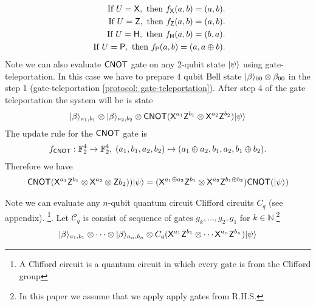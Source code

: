 \begin{equation*}
\begin{aligned}
\mbox{ If } U={\sf X},  \mbox{ then } f_{\sf X}(a,b)=(a,b).\\
\mbox{ If } U={\sf Z},  \mbox{ then } f_{\sf Z}(a,b)=(a,b).\\
\mbox{ If } U={\sf H},  \mbox{ then } f_{\sf H}(a,b)=(b,a).\\
\mbox{ If } U={\sf P},  \mbox{ then } f_ {\sf P}(a,b)=(a,a\oplus b).\\
\end{aligned}
\end{equation*}
Note we can also evaluate ${\sf CNOT}$ gate on any 2-qubit state ${\lvert}\psi\rangle$ using gate-teleportation. In this case we have to prepare $4$ qubit Bell state ${\lvert}\beta\rangle_{00}\otimes \beta_{00}$ in the step 1 (gate-teleportation \ref{protocol: gate-teleportation}). After step 4 of the gate teleportation the system will be is state
\begin{equation*}
\begin{aligned}
 {\lvert}\beta\rangle_{a_1,b_1}\otimes {\lvert}\beta\rangle_{a_2,b_2} \otimes {\sf CNOT}({\sf X}^{a_1}{\sf Z}^{b_1}\otimes {\sf X}^{a_2}{\sf Z}^{b_2}){\lvert}\psi\rangle
\end{aligned}
\end{equation*}
The update rule for the ${\sf CNOT}$ gate is
\begin{equation*}
\begin{aligned}
f_{{\sf CNOT}}:\mathbb{F}_2^4\rightarrow \mathbb{F}_2^4, \; (a_1,b_1,a_2,b_2)\mapsto (a_1\oplus a_2,b_1,a_2, b_1\oplus b_2).
\end{aligned}
\end{equation*}
Therefore we have 
\begin{equation*}
\begin{aligned}
  {\sf CNOT}({\sf X}^{a_1}{\sf Z}^{b_1}\otimes {\sf X}^{a_2}\otimes {\sf Z}{b_2})){\lvert}\psi\rangle= ({\sf X}^{a_1\oplus a_2}{\sf Z}^{b_1}\otimes {\sf X}^{a_2} {\sf Z}^{b_1\oplus b_2}){\sf CNOT}({\lvert}\psi\rangle)
 \end{aligned}
\end{equation*}
	
Note we can evaluate any $n$-qubit quantum circuit  Clifford circuits $C_q$ (see appendix). \footnote{A Clifford circuit is a quantum circuit in which every gate is from the Clifford group}. Let $\mathcal{C}_q$ is consist of sequence of gates $g_k,\ldots,g_2,g_1$ for $k\in\mathbb{N}.$\footnote{In this paper we assume that we apply apply gates from R.H.S.} 
\begin{equation}
\label{relation:update}
\begin{aligned}
 {\lvert}\beta\rangle_{a_1,b_1}\otimes \cdots \otimes {\lvert}\beta\rangle_{a_n,b_n} \otimes C_q({\sf X}^{a_1}{\sf Z}^{b_1}\otimes \cdots {\sf X}^{a_n}{\sf Z}^{b_n}){\lvert}\psi\rangle
\end{aligned}
\end{equation}

